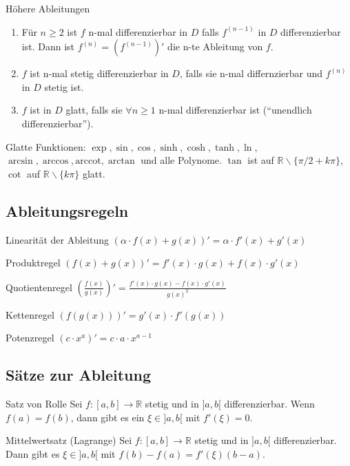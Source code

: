\documentclass[a4paper,10pt]{article}
\def\R{\mathbb{R}}
\begin{document}
\begin{mainbox}{Höhere Ableitungen}
 \begin{enumerate}
  \item Für $n \ge 2$ ist $f$ n-mal differenzierbar in $D$ falls $f^{(n-1)}$ in $D$ differenzierbar ist. Dann ist $f^{(n)} = (f^{(n-1)})'$ die n-te Ableitung von $f$.
  \item $f$ ist n-mal stetig differenzierbar in $D$, falls sie n-mal differnzierbar und $f^{(n)}$ in $D$ stetig ist.
  \item $f$ ist in $D$ glatt, falls sie $\forall n \ge 1$ n-mal differenzierbar ist (``unendlich differenzierbar'').
 \end{enumerate}
\end{mainbox}
Glatte Funktionen: $\exp, \sin, \cos, \sinh, \cosh, \tanh, \ln,$\\ $ \arcsin, \arccos, \text{arccot}, \arctan$ und alle Polynome. $\tan$ ist auf $\R \backslash \{\pi/2 + k\pi\}$, $\cot$ auf $\R \backslash \{k\pi\}$ glatt.

\subsection{Ableitungsregeln}

\begin{subbox}{Linearität der Ableitung}
 $(\alpha \cdot f(x) + g(x))' = \alpha \cdot f'(x) + g'(x)$
\end{subbox}

\begin{mainbox}{Produktregel}
 $(f(x) + g(x))' = f'(x) \cdot g(x) + f(x) \cdot g'(x)$
\end{mainbox}

\begin{mainbox}{Quotientenregel}
 $\left(\frac{f(x)}{g(x)}\right)' = \frac{f'(x) \cdot g(x) - f(x) \cdot g'(x)}{g(x)^2}$
\end{mainbox}

\begin{mainbox}{Kettenregel}
 $(f(g(x)))' = g'(x) \cdot f'(g(x))$
\end{mainbox}

\begin{subbox}{Potenzregel}
 $(c \cdot x^a)' = c \cdot a \cdot x^{a - 1}$
\end{subbox}

\subsection{Sätze zur Ableitung}
\begin{subbox}{Satz von Rolle}
 Sei $f: [a,b] \to \R$ stetig und in $]a,b[$ differenzierbar. Wenn $f(a) = f(b)$, dann gibt es ein $\xi \in ]a,b[$ mit $f'(\xi) = 0$.
\end{subbox}
\begin{mainbox}{Mittelwertsatz (Lagrange)}
 Sei $f: [a,b] \to \R$ stetig und in $]a,b[$ differenzierbar. Dann gibt es $\xi \in ]a,b[$ mit $f(b) - f(a) = f'(\xi)(b-a)$.
\end{mainbox}
\end{document}

